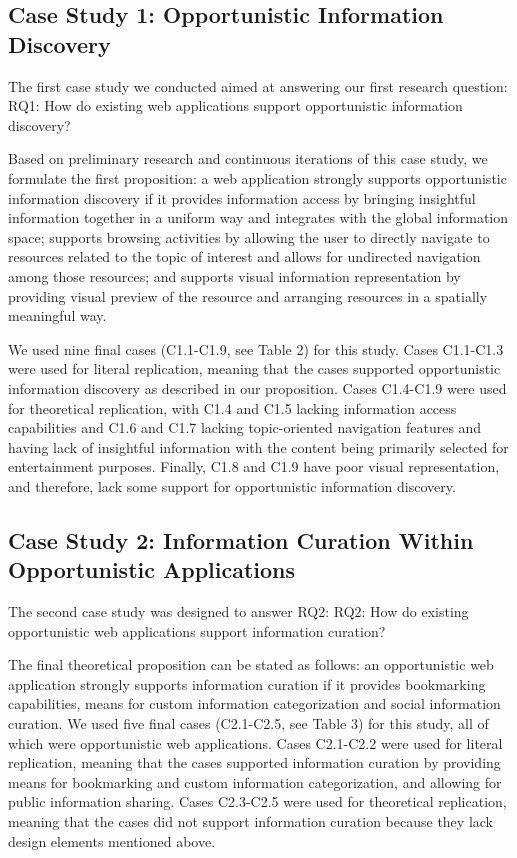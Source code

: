 \documentclass{casconpaper}
\begin{document}
{\subsection{Case Study 1: Opportunistic Information Discovery}
The first case study we conducted aimed at answering our first research question:
RQ1: How do existing web applications support opportunistic information discovery?

Based on preliminary research and continuous iterations of this case study, we formulate the first proposition: a web application strongly supports opportunistic information discovery if it provides information access by bringing insightful information together in a uniform way and integrates with the global information space; supports browsing activities by allowing the user to directly navigate to resources related to the topic of interest and allows for undirected navigation among those resources; and supports visual information representation by providing visual preview of the resource and arranging resources in a spatially meaningful way.

We used nine final cases (C1.1-C1.9, see Table 2) for this study. Cases C1.1-C1.3 were used for literal replication, meaning that the cases supported opportunistic information discovery as described in our proposition. Cases C1.4-C1.9 were used for theoretical replication, with C1.4 and C1.5 lacking information access capabilities and C1.6 and C1.7 lacking topic-oriented navigation features and having lack of insightful information with the content being primarily selected for entertainment purposes. Finally, C1.8 and C1.9 have poor visual representation, and therefore, lack some support for opportunistic information discovery.


} %
{\subsection{Case Study 2: Information Curation Within Opportunistic Applications}
The second case study was designed to answer RQ2:
RQ2: How do existing opportunistic web applications support information curation?

The final theoretical proposition can be stated as follows: an opportunistic web application strongly supports information curation if it provides bookmarking capabilities, means for custom information categorization and social information curation. We used five final cases (C2.1-C2.5, see Table 3) for this study, all of which were opportunistic web applications. Cases C2.1-C2.2 were used for literal replication, meaning that the cases supported information curation by providing means for bookmarking and custom information categorization, and allowing for public information sharing. Cases C2.3-C2.5 were used for theoretical replication, meaning that the cases did not support information curation because they lack design elements mentioned above. 


} %
\end{document}
